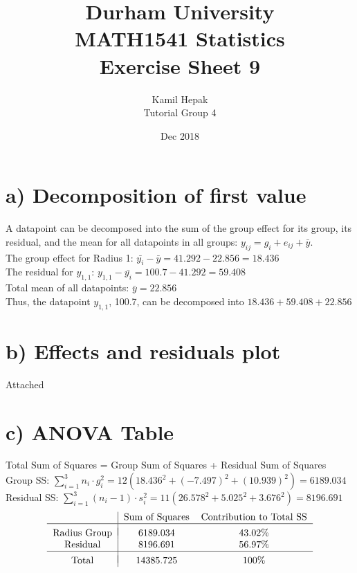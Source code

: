 \documentclass[]{article}
\title{\vspace{-3.0cm}Durham University\\
    MATH1541 Statistics \\
	Exercise Sheet 9}
\author{Kamil Hepak\\
        Tutorial Group 4}
\date{Dec 2018}
\begin{document}
\maketitle

\section{a) Decomposition of first value}
A datapoint can be decomposed into the sum of the group effect for its group, its residual, and the mean for all datapoints in all groups: $y_{ij} = g_{i} + e_{ij} + \bar{y}$.\\
The group effect for Radius 1: $\bar{y_{i}} - \bar{y} = 41.292 - 22.856 = 18.436$\\
The residual for $y_{1,1}$: $y_{1,1} - \bar{y_{i}} = 100.7 - 41.292 = 59.408$\\
Total mean of all datapoints: $\bar{y} = 22.856$\\
Thus, the datapoint $y_{1,1}$, 100.7, can be decomposed into $18.436 + 59.408 + 22.856$

\section{b) Effects and residuals plot}
Attached

\section{c) ANOVA Table}
Total Sum of Squares = Group Sum of Squares + Residual Sum of Squares
Group SS: $\sum_{i=1}^{3} n_i \cdot g_{i}^{2} = 12(18.436^2 + (-7.497)^2 + (10.939)^2) = 6189.034$\\
Residual SS: $\sum_{i=1}^{3} (n_i - 1)\cdot s_{i}^2 = 11(26.578^2 + 5.025^2 + 3.676^2) = 8196.691$
\begin{displaymath}
    \begin{tabular}{c|cc}
        &Sum of Squares&Contribution to Total SS\\
        \hline
        \\[\dimexpr-\normalbaselineskip+4pt]
        Radius Group&6189.034&43.02\%\\
        Residual&8196.691&56.97\%\\
        \hline
        \\[\dimexpr-\normalbaselineskip+4pt]
        Total&14385.725&100\%
    \end{tabular}
\end{displaymath}
\end{document}
